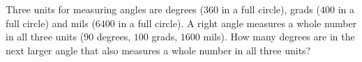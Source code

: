 Three units for measuring angles are degrees ($360$ in a full circle), grads ($400$ in a full circle) and mils ($6400$ in a full circle). A right angle measures a whole number in all three units ($90$ degrees, $100$ grads, $1600$ mils). How many degrees are in the next larger angle that also measures a whole number in all three units?
